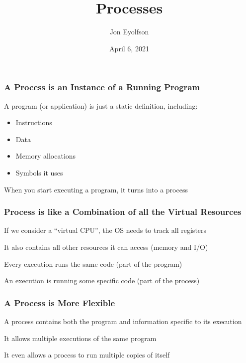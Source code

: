 

\title{Processes}
\author{Jon Eyolfson}
\date{April 6, 2021}


  \begin{frame}
    \titlepage
  \end{frame}

  \begin{frame}
    \frametitle{A Process is an Instance of a Running Program}

    A program (or application) is just a static definition, including:

    \begin{itemize}
      \item Instructions
      \item Data
      \item Memory allocations
      \item Symbols it uses
    \end{itemize}

    \vspace{2em}

    When you start executing a program, it turns into a process
  \end{frame}

  \begin{frame}
    \frametitle{Process is like a Combination of all the Virtual Resources}

    If we consider a ``virtual CPU'', the OS needs to track all registers

    \vspace{2em}

    It also contains all other resources it can access (memory and I/O)

    \vspace{4em}

    Every execution runs the same code (part of the program)

    \hspace{2em} An execution is running some specific code (part of the
                 process)
  \end{frame}

  \begin{frame}
    \frametitle{A Process is More Flexible}

    A process contains both the program and information specific
    to its execution

    \vspace{4em}

    It allows multiple executions of the same program

    \vspace{2em}

    It even allows a process to run multiple copies of itself
  \end{frame}

